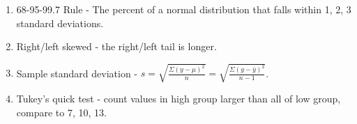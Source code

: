 \documentclass{article}
\theoremstyle{definition}
\begin{document}
\begin{enumerate}[label=\textbf{\roman*.}]
    \item 68-95-99.7 Rule - The percent of a normal distribution that falls within 1, 2, 3 standard deviations.

    \item Right/left skewed - the right/left tail is longer.

    \item Sample standard deviation - $s = \sqrt{\frac{\Sigma (y - \mu)^2}{n}} = \sqrt{\frac{\Sigma (y - \bar{y})^2}{n - 1}}$.

    \item Tukey's quick test - count values in high group larger than all of low group, compare to 7, 10, 13.

\end{enumerate}
\end{document}
